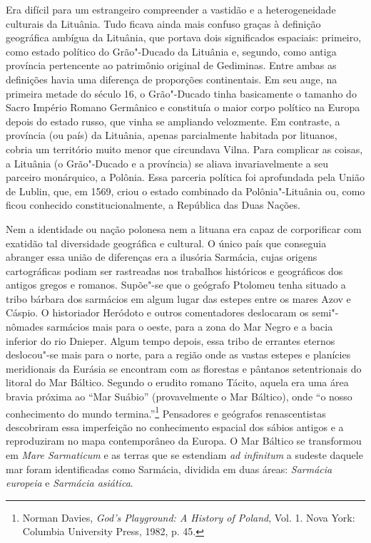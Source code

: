 Era difícil para um estrangeiro compreender a vastidão e a
heterogeneidade culturais da Lituânia. Tudo ficava ainda mais confuso
graças à definição geográfica ambígua da Lituânia, que portava dois
significados espaciais: primeiro, como estado político do Grão"-Ducado da
Lituânia e, segundo, como antiga província pertencente ao patrimônio
original de Gediminas. Entre ambas as definições havia uma diferença de
proporções continentais. Em seu auge, na primeira metade do século 16, o
Grão"-Ducado tinha basicamente o tamanho do Sacro Império Romano
Germânico e constituía o maior corpo político na Europa depois do estado
russo, que vinha se ampliando velozmente. Em contraste, a província (ou
país) da Lituânia, apenas parcialmente habitada por lituanos, cobria um
território muito menor que circundava Vilna. Para complicar as coisas, a
Lituânia (o Grão"-Ducado e a província) se aliava invariavelmente a seu
parceiro monárquico, a Polônia. Essa parceria política foi aprofundada
pela União de Lublin, que, em 1569, criou o estado combinado da
Polônia"-Lituânia ou, como ficou conhecido constitucionalmente, a
República das Duas Nações.

%

\asterisc

Nem a identidade ou nação polonesa nem a lituana era capaz de
corporificar com exatidão tal diversidade geográfica e cultural. O único
país que conseguia abranger essa união de diferenças era a ilusória
Sarmácia, cujas origens cartográficas podiam ser rastreadas nos
trabalhos históricos e geográficos dos antigos gregos e romanos.
Supõe"-se que o geógrafo Ptolomeu tenha situado a tribo bárbara dos
sarmácios em algum lugar das estepes entre os mares Azov e Cáspio. O
historiador Heródoto e outros comentadores deslocaram os semi"-nômades
sarmácios mais para o oeste, para a zona do Mar Negro e a bacia inferior
do rio Dnieper. Algum tempo depois, essa tribo de errantes eternos
deslocou"-se mais para o norte, para a região onde as vastas estepes e
planícies meridionais da Eurásia se encontram com as florestas e
pântanos setentrionais do litoral do Mar Báltico. Segundo o erudito
romano Tácito, aquela era uma área bravia próxima ao ``Mar Suábio''
(provavelmente o Mar Báltico), onde ``o nosso conhecimento do mundo
termina.''\footnote{Norman Davies, \textit{God's Playground: A History of Poland}, Vol. 1. Nova York: Columbia University Press, 1982, p. 45.} Pensadores e geógrafos renascentistas descobriram essa imperfeição no conhecimento espacial dos sábios antigos e a reproduziram
no mapa contemporâneo da Europa. O Mar Báltico se transformou em
\textit{Mare Sarmaticum} e as terras que se estendiam \textit{ad infinitum}
a sudeste daquele mar foram identificadas como Sarmácia, dividida em
duas áreas: \textit{Sarmácia europeia} e \textit{Sarmácia asiática}.

